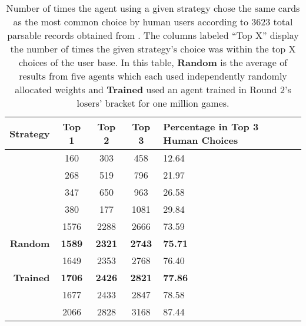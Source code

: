 
\begin{table}
	\centering

	\begin{tabular}{|r|c|c|c|p{4cm}|}
		\hline
		\textbf{Strategy} & \textbf{Top 1} & \textbf{Top 2} & \textbf{Top 3}
			& \textbf{Percentage in Top 3 Human Choices} \\
		\hline
		\peggingminavggiven & 160 & 303 & 458 & 12.64 \\\hline
		\peggingmaxmedgained & 268 & 519 & 796 & 21.97 \\\hline
		\peggingmaxavggained & 347 & 650 & 963 & 26.58 \\\hline
		\cribminavg & 380 & 177 & 1081 & 29.84 \\\hline
		\handmaxmin & 1576 & 2288 & 2666 & 73.59 \\\hline
		\textbf{Random} & \textbf{1589} & \textbf{2321} & \textbf{2743} &
			\textbf{75.71} \\\hline
		\handmaxmed & 1649 & 2353 & 2768 & 76.40 \\\hline
		\textbf{Trained} & \textbf{1706} & \textbf{2426} & \textbf{2821} &
			\textbf{77.86} \\\hline
		\handmaxposs & 1677 & 2433 & 2847 & 78.58 \\\hline
		\handmaxavg & 2066 & 2828 & 3168 & 87.44 \\\hline
	\end{tabular}
	\caption{
		Number of times the agent using a given strategy chose the same cards as
		the most common choice by human users
		according to 3623 total parsable records obtained from
		\cite{dailycribbagehand}.
		The columns labeled ``Top X'' display the number of times the given
		strategy's choice was within the top X choices of the user base.
		In this table,
		\textbf{Random} is the average of results from five agents which each used
		independently randomly allocated weights
		and
		\textbf{Trained} used an agent trained in Round 2's losers' bracket
		for one million games.
	}
	\label{tab:expts-starts-human}
\end{table}
